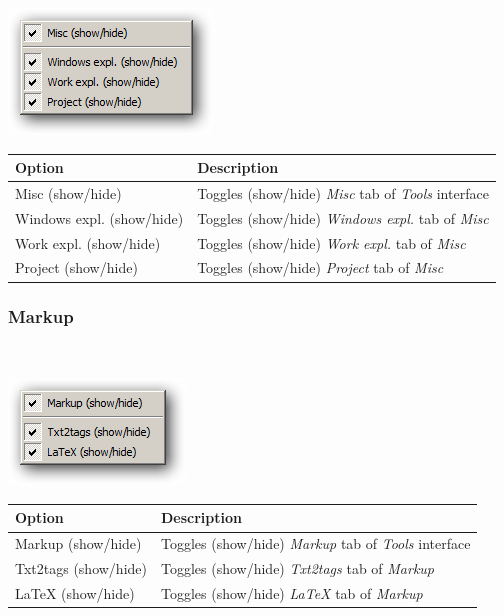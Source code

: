 \includegraphics[scale=0.50]{./res/menu_view_tools_resources_misc.png}\\

\begin{scriptsize}\begin{tabularx}{\textwidth}{>{\hsize=0.5\hsize}X>{\hsize=0.7\hsize}X}\\
    \hline
    \textbf{Option} & \textbf{Description} \\
    \hline
    Misc (show/hide) & Toggles (show/hide) \textit{Misc} tab of \textit{Tools} interface \\
    Windows expl. (show/hide) & Toggles (show/hide) \textit{Windows expl.} tab of \textit{Misc} \\
    Work expl. (show/hide) & Toggles (show/hide) \textit{Work expl.} tab of \textit{Misc} \\
    Project (show/hide) & Toggles (show/hide) \textit{Project} tab of \textit{Misc} \\
    \hline
  \end{tabularx}\end{scriptsize}


\hypertarget{menu_view_tools_resources_markup}{}
\subsubsection{Markup}\\

\includegraphics[scale=0.50]{./res/menu_view_tools_resources_markup.png}\\

\begin{scriptsize}\begin{tabularx}{\textwidth}{>{\hsize=0.3\hsize}X>{\hsize=0.7\hsize}X}\\
    \hline
    \textbf{Option} & \textbf{Description} \\
    \hline
    Markup (show/hide) & Toggles (show/hide) \textit{Markup} tab of \textit{Tools} interface \\
    Txt2tags (show/hide) & Toggles (show/hide) \textit{Txt2tags} tab of \textit{Markup} \\
    LaTeX (show/hide) & Toggles (show/hide) \textit{LaTeX} tab of \textit{Markup} \\
    \hline
  \end{tabularx}\end{scriptsize}


